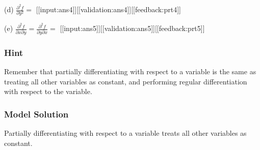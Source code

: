 \documentclass[a4paper,10pt]{article}
\begin{document}
(d) \( \frac{\partial^2 f}{\partial y^2} = \) [[input:ans4]][[validation:ans4]][[feedback:prt4]]

(e) \( \frac{\partial^2 f}{\partial x \partial y} = \frac{\partial^2 f}{\partial y \partial x} = \) [[input:ans5]][[validation:ans5]][[feedback:prt5]]
\subsubsection{Hint}
Remember that partially differentiating with respect to a variable is the same as treating all other variables as constant, and performing regular differentiation with respect to the variable.
\subsubsection{Model Solution}
Partially differentiating with respect to a variable treats all other variables as constant.
\end{document}
